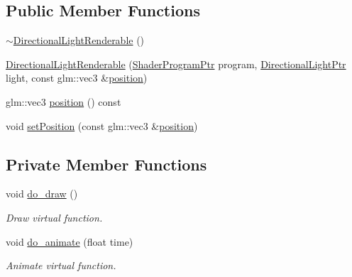 \subsection*{Public Member Functions}
\begin{DoxyCompactItemize}
\item 
\hyperlink{classDirectionalLightRenderable_aa91073f6a38fbb29c14fdc3b22474fd4}{$\sim$\+Directional\+Light\+Renderable} ()
\item 
\hyperlink{classDirectionalLightRenderable_ab3f213298b946e718834c51e56ad3713}{Directional\+Light\+Renderable} (\hyperlink{ShaderProgram_8hpp_af8e4af1ad4c53875ee5d32ab7e1f4966}{Shader\+Program\+Ptr} program, \hyperlink{Light_8hpp_ad8ef93288a101a8d8f185fb2a88f496d}{Directional\+Light\+Ptr} light, const glm\+::vec3 \&\hyperlink{classDirectionalLightRenderable_a7954a6f447fcf82f9669a4abc1f45b59}{position})
\item 
glm\+::vec3 \hyperlink{classDirectionalLightRenderable_a7954a6f447fcf82f9669a4abc1f45b59}{position} () const 
\item 
void \hyperlink{classDirectionalLightRenderable_aae92546ac8ae14e814594fdb20ceb543}{set\+Position} (const glm\+::vec3 \&\hyperlink{classDirectionalLightRenderable_a7954a6f447fcf82f9669a4abc1f45b59}{position})
\end{DoxyCompactItemize}
\subsection*{Private Member Functions}
\begin{DoxyCompactItemize}
\item 
void \hyperlink{classDirectionalLightRenderable_a9560a1e6c2b525de69140ab0d8059734}{do\+\_\+draw} ()
\begin{DoxyCompactList}\small\item\em Draw virtual function. \end{DoxyCompactList}\item 
void \hyperlink{classDirectionalLightRenderable_a7caf2f55742229944de3f6a9ee3f27ac}{do\+\_\+animate} (float time)
\begin{DoxyCompactList}\small\item\em Animate virtual function. \end{DoxyCompactList}\end{DoxyCompactItemize}
